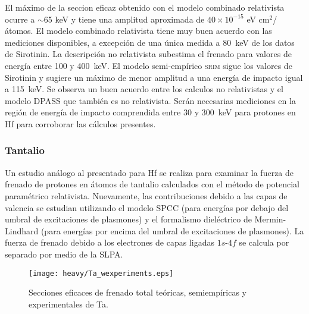 El máximo de la seccion eficaz obtenido con el modelo combinado 
relativista ocurre a $\sim$65 keV y tiene una amplitud aproximada de 
$40\times 10^{-15}$ eV cm$^2$/átomos. 
El modelo combinado relativista tiene muy buen acuerdo con las 
mediciones disponibles, a excepción de una única medida a 80~keV de los 
datos de Sirotinin. La descripción no relativista subestima el frenado 
para valores de energía entre 100 y 400~keV. El modelo semi-empírico 
\textsc{srim} sigue los valores de Sirotinin y 
sugiere un máximo de menor amplitud a una energía de impacto igual a 
115~keV. Se observa un buen acuerdo entre los calculos no relativistas 
y el modelo DPASS que también es no relativista. 
Serán necesarias mediciones en la región de energía de impacto 
comprendida entre 30 y 300~keV para protones en Hf para corroborar las 
cálculos presentes. 

\subsubsection{Tantalio}
\label{subsec:tantalio}

Un estudio análogo al presentado para Hf se realiza para examinar la 
fuerza de frenado de protones en átomos de tantalio calculados con el 
método de potencial paramétrico relativista. Nuevamente, las 
contribuciones debido a las capas de valencia se estudian utilizando el 
modelo SPCC (para energías por debajo del umbral de excitaciones de 
plasmones) y el formalismo dieléctrico de Mermin-Lindhard (para energías 
por encima del umbral de excitaciones de plasmones). La fuerza de 
frenado debido a los electrones de capas ligadas $1s$-$4f$ se calcula 
por separado por medio de la SLPA.

\begin{figure}[t]
\centering
\texttt{[image: heavy/Ta\_wexperiments.eps]}
\caption[Secciones eficaces teóricas, semiempíricas y experimentales de 
Ta.]
{Secciones eficaces de frenado total teóricas, semiempíricas y
experimentales de Ta.}
\label{fig:Ta_SP}
\end{figure}

